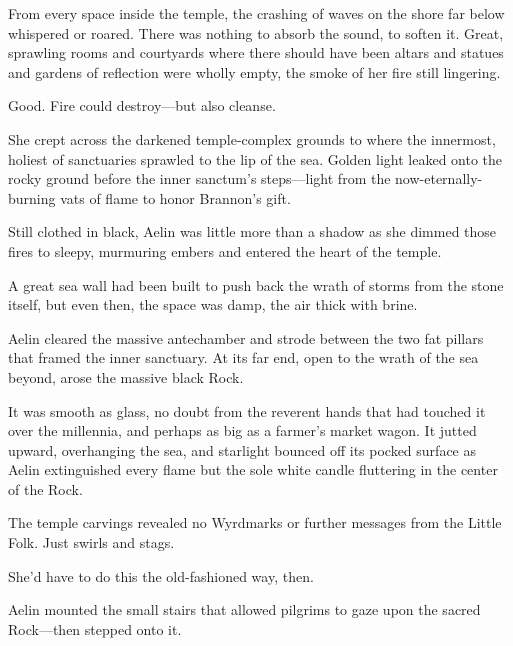 From every space inside the temple, the crashing of waves on the shore far below whispered or roared. There was nothing to absorb the sound, to soften it. Great, sprawling rooms and courtyards where there should have been altars and statues and gardens of reflection were wholly empty, the smoke of her fire still lingering.

Good. Fire could destroy---but also cleanse.

She crept across the darkened temple-complex grounds to where the innermost, holiest of sanctuaries sprawled to the lip of the sea. Golden light leaked onto the rocky ground before the inner sanctum's steps---light from the now-eternally-burning vats of flame to honor Brannon's gift.

Still clothed in black, Aelin was little more than a shadow as she dimmed those fires to sleepy, murmuring embers and entered the heart of the temple.

A great sea wall had been built to push back the wrath of storms from the stone itself, but even then, the space was damp, the air thick with brine.

Aelin cleared the massive antechamber and strode between the two fat pillars that framed the inner sanctuary. At its far end, open to the wrath of the sea beyond, arose the massive black Rock.

It was smooth as glass, no doubt from the reverent hands that had touched it over the millennia, and perhaps as big as a farmer's market wagon. It jutted upward, overhanging the sea, and starlight bounced off its pocked surface as Aelin extinguished every flame but the sole white candle fluttering in the center of the Rock.

The temple carvings revealed no Wyrdmarks or further messages from the Little Folk. Just swirls and stags.

She'd have to do this the old-fashioned way, then.

Aelin mounted the small stairs that allowed pilgrims to gaze upon the sacred Rock---then stepped onto it.
